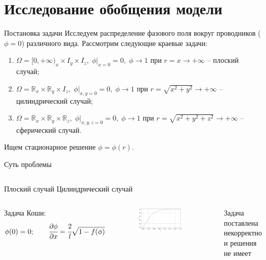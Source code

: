 
\section{Исследование обобщения модели}

\begin{frame}{Постановка задачи}
Исследуем распределение фазового поля вокруг проводников ($\phi = 0$) различного вида. Рассмотрим
следующие краевые задачи:
\begin{enumerate}
	\item $\Omega = [0, +\infty)_x \times I_y \times I_z, \; \phi|_{x = 0} = 0, \; \phi \to 1$ при
	$r = x \to +\infty$ -- плоский случай;
	\item $\Omega = \mathbb{R}_x \times \mathbb{R}_y \times I_z, \; \phi|_{x, y = 0} = 0, \;
	\phi \to 1$ при $r = \sqrt{x^2 + y^2} \to +\infty$ -- \\ цилиндрический случай;
	\item $\Omega = \mathbb{R}_x \times \mathbb{R}_y \times \mathbb{R}_z, \;
	\phi|_{x, y, z = 0} = 0, \; \phi \to 1$ при $r = \sqrt{x^2 + y^2 + z^2} \to +\infty$ -- \\
	сферический случай.
\end{enumerate}
Ищем стационарное решение $\phi = \phi(r)$.
\end{frame}


\begin{frame}{Суть проблемы}
\begin{columns}
\centering
Плоский случай
\centering
Цилиндрический случай
\end{columns}
\vspace{0.5cm}
\begin{columns}
Задача Коши:
\vspace{-0.3cm}
$$\phi(0) = 0; \qquad \cfrac{\partial \phi}{\partial x} = \cfrac{2}{l} \sqrt{1 - f(\phi)}$$
\begin{figure}
	\includegraphics[width=\textwidth]{figures/result_volumes.png}
\end{figure}
\rule{0.4pt}{0.7\textheight}
\centering
Задача поставлена некорректно \\ и решения не имеет \cite{zipunova_higher_codimension}
\end{columns}
\end{frame}


